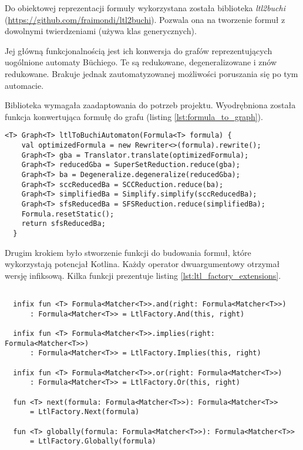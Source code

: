 Do obiektowej reprezentacji formuły wykorzystana została biblioteka \textit{ltl2buchi} \\(\url{https://github.com/fraimondi/ltl2buchi}).
Pozwala ona na tworzenie formuł z dowolnymi twierdzeniami (używa klas generycznych).

Jej główną funkcjonalnością jest ich konwersja do grafów reprezentujących uogólnione automaty Büchiego.
Te są redukowane, degeneralizowane i znów redukowane.
Brakuje jednak zautomatyzowanej możliwości poruszania się po tym automacie.

Biblioteka wymagała zaadaptowania do potrzeb projektu.
Wyodrębniona została funkcja konwertująca formułę do grafu (listing \ref{lst:formula_to_graph}).

\begin{minipage}{\linewidth}
\begin{lstlisting}[caption={Funkcja konwertująca formułę LTL do grafu.},captionpos=b,label={lst:formula_to_graph}]
  <T> Graph<T> ltlToBuchiAutomaton(Formula<T> formula) {
    val optimizedFormula = new Rewriter<>(formula).rewrite();
    Graph<T> gba = Translator.translate(optimizedFormula);
    Graph<T> reducedGba = SuperSetReduction.reduce(gba);
    Graph<T> ba = Degeneralize.degeneralize(reducedGba);
    Graph<T> sccReducedBa = SCCReduction.reduce(ba);
    Graph<T> simplifiedBa = Simplify.simplify(sccReducedBa);
    Graph<T> sfsReducedBa = SFSReduction.reduce(simplifiedBa);
    Formula.resetStatic();
    return sfsReducedBa;
  }

\end{lstlisting}
\end{minipage}

Drugim krokiem było stworzenie funkcji do budowania formuł, które wykorzystają potencjał Kotlina.
Każdy operator dwuargumentowy otrzymał wersję infiksową.
Kilka funkcji prezentuje listing \ref{lst:ltl_factory_extensions}.

\begin{minipage}{\linewidth}
\begin{lstlisting}[caption={Przykładowe funkcje do budowania formuł w języku Kotlin.},captionpos=b,label={lst:ltl_factory_extensions}]

  infix fun <T> Formula<Matcher<T>>.and(right: Formula<Matcher<T>>)
      : Formula<Matcher<T>> = LtlFactory.And(this, right)

  infix fun <T> Formula<Matcher<T>>.implies(right: Formula<Matcher<T>>)
      : Formula<Matcher<T>> = LtlFactory.Implies(this, right)

  infix fun <T> Formula<Matcher<T>>.or(right: Formula<Matcher<T>>)
      : Formula<Matcher<T>> = LtlFactory.Or(this, right)

  fun <T> next(formula: Formula<Matcher<T>>): Formula<Matcher<T>>
      = LtlFactory.Next(formula)

  fun <T> globally(formula: Formula<Matcher<T>>): Formula<Matcher<T>>
      = LtlFactory.Globally(formula)

\end{lstlisting}
\end{minipage}

